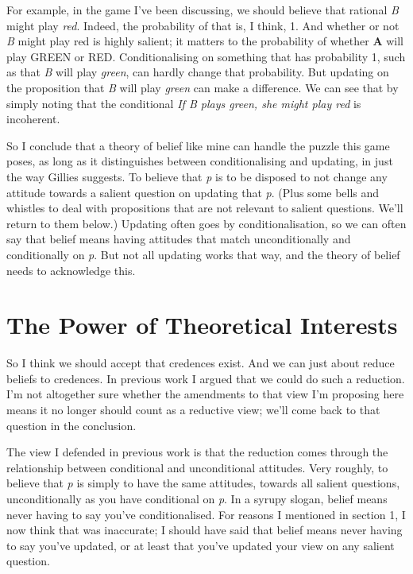 For example, in the game I've been discussing, we should believe that rational \textit{B} might play \textit{red}. Indeed, the probability of that is, I think, 1. And whether or not \textit{B} might play red is highly salient; it matters to the probability of whether \textbf{A} will play GREEN or RED. Conditionalising on something that has probability 1, such as that \textit{B} will play \textit{green}, can hardly change that probability. But updating on the proposition that \textit{B} will play \textit{green} can make a difference. We can see that by simply noting that the conditional \textit{If B plays green, she might play red} is incoherent.

So I conclude that a theory of belief like mine can handle the puzzle this game poses, as long as it distinguishes between conditionalising and updating, in just the way Gillies suggests. To believe that \textit{p} is to be disposed to not change any attitude towards a salient question on updating that \textit{p}. (Plus some bells and whistles to deal with propositions that are not relevant to salient questions. We'll return to them below.) Updating often goes by conditionalisation, so we can often say that belief means having attitudes that match unconditionally and conditionally on \textit{p}. But not all updating works that way, and the theory of belief needs to acknowledge this.

\section{The Power of Theoretical Interests}
So I think we should accept that credences exist. And we can just about reduce beliefs to credences. In previous work I argued that we could do such a reduction. I'm not altogether sure whether the amendments to that view I'm proposing here means it no longer should count as a reductive view; we'll come back to that question in the conclusion.

The view I defended in previous work is that the reduction comes through the relationship between conditional and unconditional attitudes. Very roughly, to believe that \emph{p} is simply to have the same attitudes, towards all salient questions, unconditionally as you have conditional on \emph{p}. In a syrupy slogan, belief means never having to say you've conditionalised. For reasons I mentioned in section 1, I now think that was inaccurate; I should have said that belief means never having to say you've updated, or at least that you've updated your view on any salient question.

